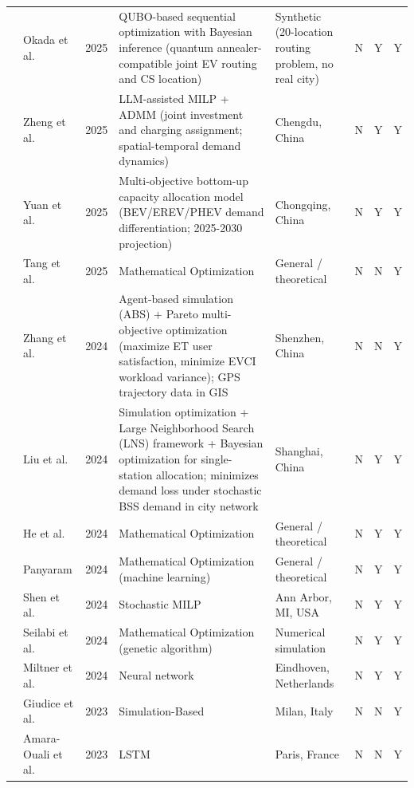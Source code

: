 \documentclass[letterpaper, 12pt, oneside, doublespacing]{Thesis}
\begin{document}
\begin{longtable}{L{0.9cm} L{1.8cm} L{0.7cm} L{2.5cm} L{2.1cm} L{0.7cm} L{0.7cm} L{0.7cm}}
\cite{joint_optimization_2025} & Okada et al. & 2025 & QUBO-based sequential optimization with Bayesian inference (quantum annealer-compatible joint EV routing and CS location) & Synthetic (20-location routing problem, no real city) & N & Y & Y \\
\cite{large_language_2025} & Zheng et al. & 2025 & LLM-assisted MILP + ADMM (joint investment and charging assignment; spatial-temporal demand dynamics) & Chengdu, China & N & Y & Y \\
\cite{planning_future_2025} & Yuan et al. & 2025 & Multi-objective bottom-up capacity allocation model (BEV/EREV/PHEV demand differentiation; 2025-2030 projection) & Chongqing, China & N & Y & Y \\
\cite{stochastic_behavior_2025} & Tang et al. & 2025 & Mathematical Optimization & General {\slash} theoretical & N & N & Y \\
\cite{a_data-driven_2024} & Zhang et al. & 2024 & Agent-based simulation (ABS) + Pareto multi-objective optimization (maximize ET user satisfaction, minimize EVCI workload variance); GPS trajectory data in GIS & Shenzhen, China & N & N & Y \\
\cite{battery_swapping_2024} & Liu et al. & 2024 & Simulation optimization + Large Neighborhood Search (LNS) framework + Bayesian optimization for single-station allocation; minimizes demand loss under stochastic BSS demand in city network & Shanghai, China & N & Y & Y \\
\cite{optimal_evcs_2024} & He et al. & 2024 & Mathematical Optimization & General {\slash} theoretical & N & Y & Y \\
\cite{optimization_strategies_2024} & Panyaram & 2024 & Mathematical Optimization (machine learning) & General {\slash} theoretical & N & Y & Y \\
\cite{sequential_charging_2024} & Shen et al. & 2024 & Stochastic MILP & Ann Arbor, MI, USA & N & Y & Y \\
\cite{sustainable_planning_2024} & Seilabi et al. & 2024 & Mathematical Optimization (genetic algorithm) & Numerical simulation & N & Y & Y \\
\cite{towards_using_2024} & Miltner et al. & 2024 & Neural network & Eindhoven, Netherlands & N & Y & Y \\
\cite{definition_of_2023} & Giudice et al. & 2023 & Simulation-Based & Milan, Italy & N & N & Y \\
\cite{forecasting_electric_2023} & Amara-Ouali et al. & 2023 & LSTM & Paris, France & N & N & Y \\

\end{longtable}
\end{document}
